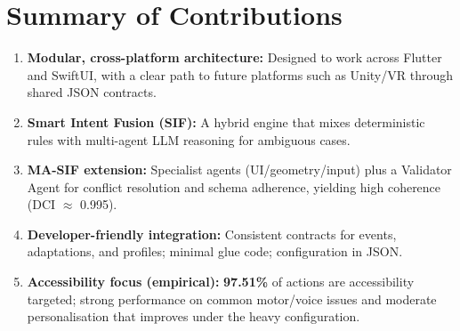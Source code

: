 \section{Summary of Contributions}
\begin{enumerate}
    \item \textbf{Modular, cross-platform architecture:} Designed to work across Flutter and SwiftUI, with a clear path to future platforms such as Unity/VR through shared JSON contracts.
    \item \textbf{Smart Intent Fusion (SIF):} A hybrid engine that mixes deterministic rules with multi-agent LLM reasoning for ambiguous cases.
    \item \textbf{MA-SIF extension:} Specialist agents (UI/geometry/input) plus a Validator Agent for conflict resolution and schema adherence, yielding high coherence (DCI $\approx$ 0.995).
    \item \textbf{Developer-friendly integration:} Consistent contracts for events, adaptations, and profiles; minimal glue code; configuration in JSON.
    \item \textbf{Accessibility focus (empirical):} \textbf{97.51\%} of actions are accessibility targeted; strong performance on common motor/voice issues and moderate personalisation that improves under the heavy configuration.
\end{enumerate}

